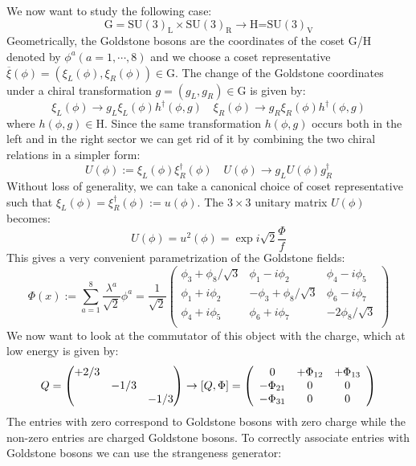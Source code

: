 \documentclass[../main.tex]{subfiles}
\begin{document}
We now want to study the following case:
\[
\text{G}=\text{SU}(3)_{\text{L}}\times\text{SU}(3)_{\text{R}}\to\text{H=SU}(3)_{\text{V}}
\]
Geometrically, the Goldstone bosons are the coordinates of the coset G/H denoted by $\phi^a(a=1,\cdots,8)$ 
and we choose a coset representative $\overline{\xi}(\phi)=(\xi_L(\phi),\xi_R(\phi))\in\text{G}$. The change of the Goldstone coordinates under a chiral transformation $g=(g_L,g_R)\in\text{G}$ is given by:
\[
\xi_L(\phi)\to g_L\xi_L(\phi)h^\dagger(\phi,g) \quad \xi_R(\phi)\to g_R\xi_R(\phi)h^\dagger(\phi,g)
\]
where $h(\phi,g)\in\text{H}$. Since the same transformation $h(\phi,g)$ occurs both in the left and in the right sector we can get rid of it by combining the two chiral relations in a simpler form:
\[
U(\phi):=\xi_L(\phi)\xi_R^\dagger(\phi) \quad U(\phi)\to g_LU(\phi)g_R^\dagger
\]
Without loss of generality, we can take a canonical choice of coset representative such that $\xi_L(\phi)=\xi_R^\dagger(\phi):=u(\phi)$. The $3\times3$ unitary matrix $U(\phi)$ becomes:
\[
U(\phi)=u^2(\phi)=\exp{i\sqrt{2}\frac{\Phi}{f}}
\]
This gives a very convenient parametrization of the Goldstone fields:
\[
\Phi(x):=\sum_{a=1}^8\frac{\lambda^a}{\sqrt{2}}\phi^a=\frac{1}{\sqrt{2}}\left(\begin{array}{ccc}
    \phi_3+\phi_8/\sqrt{3} & \phi_1-i\phi_2 & \phi_4-i\phi_5 \\
    \phi_1+i\phi_2 & -\phi_3+\phi_8/\sqrt{3} & \phi_6-i\phi_7 \\
    \phi_4+i\phi_5 & \phi_6+i\phi_7 & -2\phi_8/\sqrt{3} \\
\end{array}\right)
\]
We now want to look at the commutator of this object with the charge, which at low energy is given by:
\[
Q=\mqty(\dmat{+2/3,-1/3,-1/3})\to[Q,\Phi]=\left(\begin{array}{ccc}
    0 & +\Phi_{12} & +\Phi_{13} \\
    -\Phi_{21} & 0 & 0 \\
    -\Phi_{31} & 0 & 0
\end{array}\right)
\]
The entries with zero correspond to Goldstone bosons with zero charge while the non-zero entries are charged Goldstone bosons. To correctly associate entries with Goldstone bosons we can use the strangeness generator:
\end{document}
